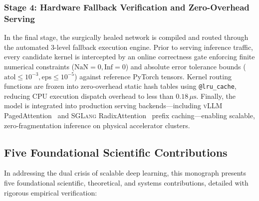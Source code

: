 \subsubsection{Stage 4: Hardware Fallback Verification and Zero-Overhead Serving}
\label{subsubsec:stage4_serving}

In the final stage, the surgically healed network is compiled and routed through the automated 3-level fallback execution engine.
Prior to serving inference traffic, every candidate kernel is intercepted by an online correctness gate enforcing finite numerical constraints ($\text{NaN} = 0, \text{Inf} = 0$) and absolute error tolerance bounds ($\text{atol} \le 10^{-3}, \text{eps} \le 10^{-5}$) against reference PyTorch tensors.
Kernel routing functions are frozen into zero-overhead static hash tables using \texttt{@lru\_cache}, reducing CPU execution dispatch overhead to less than $0.18\,\mu\text{s}$.
Finally, the model is integrated into production serving backends—including \textsc{vLLM} PagedAttention~\cite{kwon2023vllm} and \textsc{SGLang} RadixAttention~\cite{zheng2024sglang} prefix caching—enabling scalable, zero-fragmentation inference on physical accelerator clusters.


\subsection{Five Foundational Scientific Contributions}
\label{subsec:contributions}

In addressing the dual crisis of scalable deep learning, this monograph presents five foundational scientific, theoretical, and systems contributions, detailed with rigorous empirical verification:

